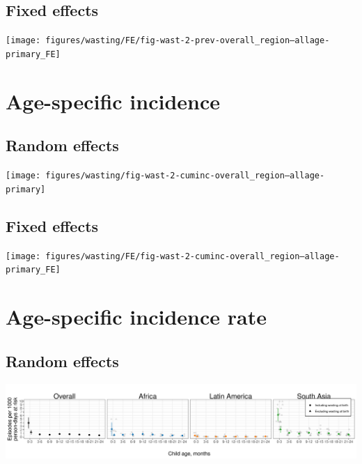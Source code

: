 \documentclass[
  9pt,
]{book}
\begin{document}
\hypertarget{fixed-effects-1}{%
\subsection{Fixed effects}\label{fixed-effects-1}}

\texttt{[image: figures/wasting/FE/fig-wast-2-prev-overall\_region--allage-primary\_FE]}

\hypertarget{age-specific-incidence}{%
\section{Age-specific incidence}\label{age-specific-incidence}}

\hypertarget{random-effects-1}{%
\subsection{Random effects}\label{random-effects-1}}

\texttt{[image: figures/wasting/fig-wast-2-cuminc-overall\_region--allage-primary]}

\hypertarget{fixed-effects-2}{%
\subsection{Fixed effects}\label{fixed-effects-2}}

\texttt{[image: figures/wasting/FE/fig-wast-2-cuminc-overall\_region--allage-primary\_FE]}

\hypertarget{age-specific-incidence-rate}{%
\section{Age-specific incidence rate}\label{age-specific-incidence-rate}}

\hypertarget{random-effects-2}{%
\subsection{Random effects}\label{random-effects-2}}

\includegraphics[width=58.33in]{figures/wasting/fig-wast-2-ir-overall_region--allage-primary}
\end{document}
